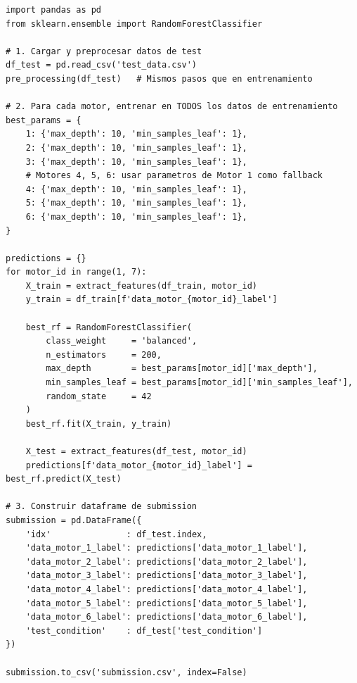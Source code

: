 \documentclass[12pt,a4paper]{article}
\begin{document}
\begin{lstlisting}[caption={Proceso de entrenamiento final y predicci\'{o}n}]
import pandas as pd
from sklearn.ensemble import RandomForestClassifier

# 1. Cargar y preprocesar datos de test
df_test = pd.read_csv('test_data.csv')
pre_processing(df_test)   # Mismos pasos que en entrenamiento

# 2. Para cada motor, entrenar en TODOS los datos de entrenamiento
best_params = {
    1: {'max_depth': 10, 'min_samples_leaf': 1},
    2: {'max_depth': 10, 'min_samples_leaf': 1},
    3: {'max_depth': 10, 'min_samples_leaf': 1},
    # Motores 4, 5, 6: usar parametros de Motor 1 como fallback
    4: {'max_depth': 10, 'min_samples_leaf': 1},
    5: {'max_depth': 10, 'min_samples_leaf': 1},
    6: {'max_depth': 10, 'min_samples_leaf': 1},
}

predictions = {}
for motor_id in range(1, 7):
    X_train = extract_features(df_train, motor_id)
    y_train = df_train[f'data_motor_{motor_id}_label']

    best_rf = RandomForestClassifier(
        class_weight     = 'balanced',
        n_estimators     = 200,
        max_depth        = best_params[motor_id]['max_depth'],
        min_samples_leaf = best_params[motor_id]['min_samples_leaf'],
        random_state     = 42
    )
    best_rf.fit(X_train, y_train)

    X_test = extract_features(df_test, motor_id)
    predictions[f'data_motor_{motor_id}_label'] = best_rf.predict(X_test)

# 3. Construir dataframe de submission
submission = pd.DataFrame({
    'idx'               : df_test.index,
    'data_motor_1_label': predictions['data_motor_1_label'],
    'data_motor_2_label': predictions['data_motor_2_label'],
    'data_motor_3_label': predictions['data_motor_3_label'],
    'data_motor_4_label': predictions['data_motor_4_label'],
    'data_motor_5_label': predictions['data_motor_5_label'],
    'data_motor_6_label': predictions['data_motor_6_label'],
    'test_condition'    : df_test['test_condition']
})

submission.to_csv('submission.csv', index=False)
\end{lstlisting}
\end{document}
